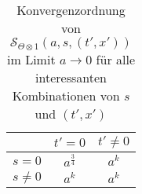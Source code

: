 \begin{table}[h]
\centering
\begin{tabular}{l|cc}
           & \multicolumn{1}{l}{$t'=0$} & \multicolumn{1}{l}{$t' \neq 0$} \\ \hline
$s = 0$    & $a^{\frac{3}{4}}$          & $a^k$                           \\
$s \neq 0$ & $a^k$                      & $a^k$
\end{tabular}
\caption{Konvergenzordnung von $\mathcal{S}_{\Theta \otimes 1} (a,s,(t',x'))$ im Limit $a \rightarrow 0$ für alle interessanten Kombinationen von $s$ und $(t',x')$}
\label{tab:wavefront_set_heaviside}
\end{table}



